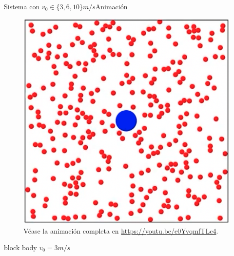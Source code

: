 \documentclass{beamer}
\begin{document}
            \begin{frame}{Sistema con $v_0 \in \{ 3, 6, 10\}m/s$}{Animación}
                \begin{minipage}[t]{0.3\textwidth}
                    \begin{figure}[H!]
                        \includegraphics[width=\textwidth]{./animation_obstacle_still_v_3}
                        \caption*{Véase la animación completa en \url{https://youtu.be/e0YvqmfTLc4}.}
                        \label{fig:a_2}
                    \end{figure}
                    \begin{beamercolorbox}[sep=5pt,center]{block body}
                        \centering
                        \small{$v_0=3m/s$}
                    \end{beamercolorbox}
                \end{minipage}
                \hfill
                \begin{minipage}[t]{0.30\textwidth}
                    \begin{figure}[H!]

\end{figure}
\end{minipage}
\end{frame}
\end{document}
